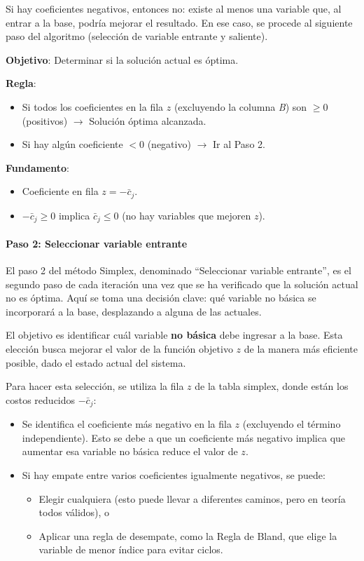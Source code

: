Si hay coeficientes negativos, entonces no: existe al menos una variable que, al entrar a la base, podría mejorar el resultado. En ese caso, se procede al siguiente paso del algoritmo (selección de variable entrante y saliente).

\begin{tcolorbox}[title=Resumen del paso 1]
  \noindent \textbf{Objetivo}: Determinar si la solución actual es óptima.

  \noindent \textbf{Regla}:
  \begin{itemize}
    \item Si todos los coeficientes en la fila \(z\) (excluyendo la columna \textit{B}) son \(\geq 0\) (positivos) \(\rightarrow\) Solución óptima alcanzada.
    \item Si hay algún coeficiente \(< 0\) (negativo) \(\rightarrow\) Ir al Paso 2.
  \end{itemize}

  \noindent \textbf{Fundamento}:
  \begin{itemize}
    \item Coeficiente en fila \(z = -\bar{c}_j\).
    \item \(-\bar{c}_j \geq 0\) implica \(\bar{c}_j \leq 0\) (no hay variables que mejoren \(z\)).
  \end{itemize}
\end{tcolorbox}

\paragraph{Paso 2: Seleccionar variable entrante}

El paso 2 del método Simplex, denominado ``Seleccionar variable entrante'', es el segundo paso de cada iteración una vez que se ha verificado que la solución actual no es óptima. Aquí se toma una decisión clave: qué variable no básica se incorporará a la base, desplazando a alguna de las actuales.

El objetivo es identificar cuál variable \textbf{no básica} debe ingresar a la base. Esta elección busca mejorar el valor de la función objetivo \(z\) de la manera más eficiente posible, dado el estado actual del sistema.

Para hacer esta selección, se utiliza la fila \(z\) de la tabla simplex, donde están los costos reducidos \(-\bar{c}_j\):
\begin{itemize}
  \item Se identifica el coeficiente más negativo en la fila \(z\) (excluyendo el término independiente). Esto se debe a que un coeficiente más negativo implica que aumentar esa variable no básica reduce el valor de \(z\).
  \item Si hay empate entre varios coeficientes igualmente negativos, se puede:
  \begin{itemize}
    \item Elegir cualquiera (esto puede llevar a diferentes caminos, pero en teoría todos válidos), o
    \item Aplicar una regla de desempate, como la Regla de Bland, que elige la variable de menor índice para evitar ciclos.
  \end{itemize}
\end{itemize}

